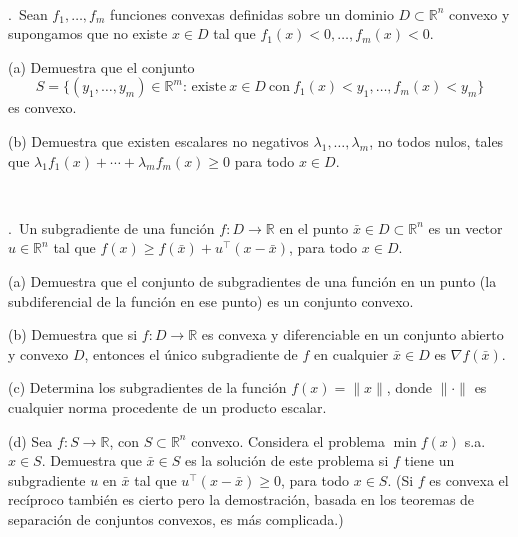 \documentclass[11pt,a4paper,twoside]{article}
\newcounter{problem} \setcounter{problem}{1}
\newcommand{\ex}{\noindent {\sf \bf \theproblem}\addtocounter{problem}{1}.\ }
\begin{document}
\

 \ex Sean $f_1,\ldots,f_m$ funciones convexas definidas sobre un dominio $D\subset\mathbb{R}^n$ convexo y supongamos que no existe $x\in D$ tal que $f_1(x)<0,\ldots,f_m(x)<0$.
\begin{compactitem}
\item[(a)] Demuestra que el conjunto 
\[
S=\{(y_1,\ldots,y_m)\in\mathbb{R}^m:\, \mbox{existe}\ x\in D\ \mbox{con}\ f_1(x)<y_1,\ldots,f_m(x)<y_m\}
\]
es convexo.
\item[(b)] Demuestra que existen escalares no negativos $\lambda_1,\ldots,\lambda_m$, no todos nulos, tales que $\lambda_1 f_1(x)+\cdots + \lambda_m f_m(x)\geq 0$ para todo $x\in D$.
\end{compactitem}


\

\ex Un subgradiente de una función $f:D\to\mathbb{R}$ en el punto $\bar{x}\in D\subset \mathbb{R}^n$ es un vector $u\in\mathbb{R}^n$ tal que $f(x)\geq f(\bar{x}) + u^\top (x-\bar{x})$, para todo $x\in D$. 
\begin{compactitem}
\item[(a)] Demuestra que el conjunto de subgradientes de una función en un punto (la subdiferencial de la función en ese punto) es un conjunto convexo. 
\item[(b)] Demuestra que si $f:D\to\mathbb{R}$ es convexa y diferenciable en un conjunto abierto y convexo $D$, entonces el único subgradiente de $f$ en cualquier $\bar{x}\in D$ es $\nabla f(\bar{x})$.
\item[(c)] Determina los subgradientes de la función $f(x)=\|x\|$, donde $\|\cdot\|$ es cualquier norma procedente de un producto escalar.
\item[(d)] Sea $f:S\to \mathbb{R}$, con $S\subset\mathbb{R}^n$ convexo. Considera el problema $\min f(x)$ s.a. $x\in S$. Demuestra que $\bar{x}\in S$ es la solución de este problema si $f$ tiene un subgradiente $u$ en $\bar{x}$ tal que $u^\top (x-\bar{x})\geq 0$, para todo $x\in S$. (Si $f$ es convexa el recíproco también es cierto pero la demostración, basada en los teoremas de separación de conjuntos convexos, es más complicada.)  
\end{compactitem}

\end{document}
